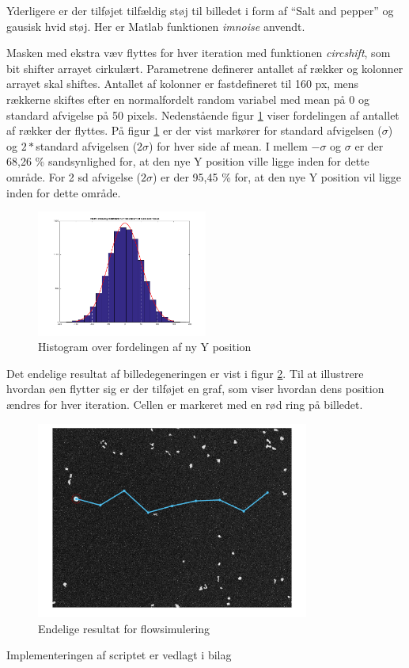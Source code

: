 Yderligere er der tilføjet tilfældig støj til billedet i form af “Salt and pepper” og gausisk hvid støj. Her er Matlab funktionen \textit{imnoise} anvendt. 

Masken med ekstra væv flyttes for hver iteration med funktionen \textit{circshift}, som bit shifter arrayet cirkulært. Parametrene definerer antallet af rækker og kolonner arrayet skal shiftes.  Antallet af kolonner er fastdefineret til 160 px, mens rækkerne skiftes efter en normalfordelt random variabel med mean på 0 og standard afvigelse på 50 pixels. Nedenstående figur \ref{fig:histfit} viser fordelingen af antallet af rækker der flyttes. På figur \ref{fig:histfit} er der vist markører for standard afvigelsen ($\sigma$) og $2*$standard afvigelsen ($2\sigma$) for hver side af mean. I mellem $-\sigma$ og $\sigma$ er der 68,26 \% sandsynlighed for, at den nye Y position ville ligge inden for dette område. For 2 sd afvigelse ($2\sigma$) er der 95,45 \% for, at den nye Y position vil ligge inden for dette område.

\begin{figure}[H]
	\centering
	\includegraphics[width=0.5\textwidth]{billeder/software/histfit.png}
	\caption{Histogram over fordelingen af ny Y position}
	\label{fig:histfit}
\end{figure}

Det endelige resultat af billedegeneringen er vist i figur \ref{fig:finalresult}. Til at illustrere hvordan øen flytter sig er der tilføjet en graf, som viser hvordan dens position ændres for hver iteration. Cellen er markeret med en rød ring på billedet.

\begin{figure}[H]
	\centering
	\includegraphics[width=0.8\textwidth]{billeder/software/final.png}
	\caption{Endelige resultat for flowsimulering}
	\label{fig:finalresult}
\end{figure}

Implementeringen af scriptet er vedlagt i bilag 